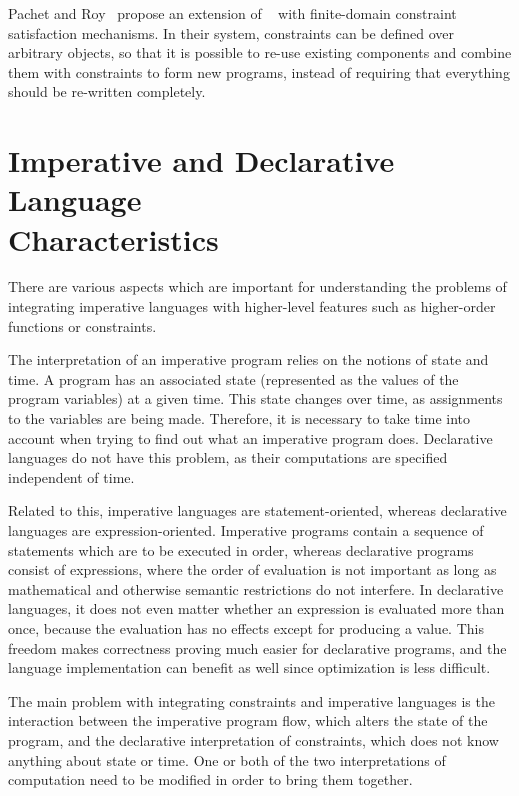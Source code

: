 Pachet and Roy~\cite{pachet95mixing} propose an extension of
\smalltalk{}~\cite{goldberg83smalltalk} with finite-domain constraint
satisfaction mechanisms.  In their system, constraints can be defined
over arbitrary \smalltalk{} objects, so that it is possible to re-use
existing components and combine them with constraints to form new
programs, instead of requiring that everything should be re-written
completely.

\section[Imperative and Declarative Language Characteristics]{Imperative and Declarative Language\\Characteristics}

There are various aspects which are important for understanding the
problems of integrating imperative languages with higher-level
features such as higher-order functions or constraints.

The interpretation of an imperative program relies on the notions of
state and time.  A program has an associated state (represented as the
values of the program variables) at a given time.  This state changes
over time, as assignments to the variables are being made.  Therefore,
it is necessary to take time into account when trying to find out what
an imperative program does.  Declarative languages do not have this
problem, as their computations are specified independent of time.

Related to this, imperative languages are statement-oriented, whereas
declarative languages are expression-oriented.  Imperative programs
contain a sequence of statements which are to be executed in order,
whereas declarative programs consist of expressions, where the order
of evaluation is not important as long as mathematical and otherwise
semantic restrictions do not interfere.  In declarative languages, it
does not even matter whether an expression is evaluated more than
once, because the evaluation has no effects except for producing a
value.  This freedom makes correctness proving much easier for
declarative programs, and the language implementation can benefit as
well since optimization is less difficult.

The main problem with integrating constraints and imperative languages
is the interaction between the imperative program flow, which alters
the state of the program, and the declarative interpretation of
constraints, which does not know anything about state or time.  One or
both of the two interpretations of computation need to be modified in
order to bring them together.



